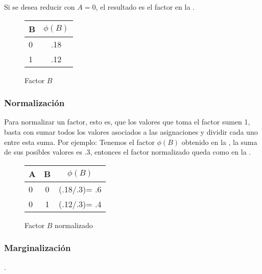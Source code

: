 \noindent Si se desea reducir con $A = 0$, el resultado es el factor en la .

\begin{figure}[h]
  \begin{center}
    \begin{tabular}{ l | c }
      B & \(\phi(B)\)\\ \hline
      0 & .18  \\ \hline
      1 & .12  \\
    \end{tabular}
  \end{center}
  \caption{Factor \(B\)}
  \label{fig:FactorA0B}
\end{figure}

\subsubsection{Normalización}
Para normalizar un factor, esto es, que los valores que toma el factor sumen 1, basta con sumar todos los valores asociados a las asignaciones y dividir cada uno entre esta suma. Por ejemplo: Tenemos el factor \(\phi(B)\) obtenido en la , la suma de sus posibles valores es .3, entonces el factor normalizado queda como en la .

\begin{figure}[H]
  \begin{center}
    \begin{tabular}{ l  c | c }
      A & B &  \(\phi(B)\)\\ \hline
      0 & 0 & (.18/.3)= .6  \\ \hline
      0 & 1 & (.12/.3)= .4 \\
    \end{tabular}
  \end{center}
  \caption{Factor \(B\) normalizado}
  \label{fig:FactorA0BNorm}
\end{figure}


\subsubsection{Marginalización}
 \parencite[297]{KollerFriedman2009}.


